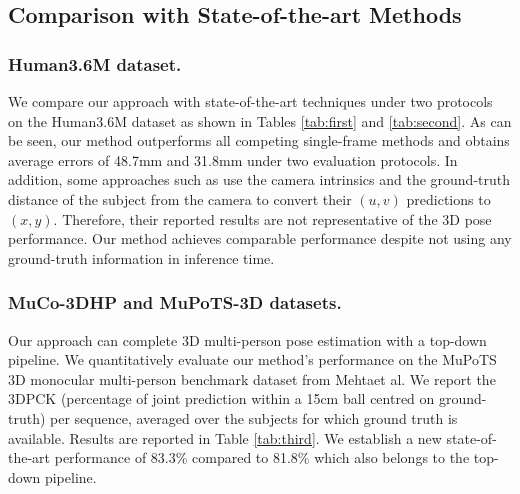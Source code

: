\documentclass[letterpaper]{article} \usepackage{aaai21}  \usepackage{times}  \usepackage{helvet} \usepackage{courier}  \usepackage[hyphens]{url}  \usepackage{graphicx} \urlstyle{rm} \def\UrlFont{\rm}  \usepackage{natbib}  \usepackage{caption} \frenchspacing  \setlength{\pdfpagewidth}{8.5in}  \setlength{\pdfpageheight}{11in}
\begin{document}
\subsection{Comparison with State-of-the-art Methods}

\subsubsection{Human3.6M dataset.}
We compare our approach with state-of-the-art techniques under two protocols on the Human3.6M dataset \cite{ionescu2013human3} as shown in Tables \ref{tab:first} and \ref{tab:second}. As can be seen, our method outperforms all competing single-frame methods and obtains average errors of 48.7mm and 31.8mm under two evaluation protocols. In addition, some approaches such as \cite{sun2018integral,zhou2019hemlets} use the camera intrinsics and the ground-truth distance of the subject from the camera to convert their $(u,v)$ predictions to $(x,y)$. Therefore, their reported results are not representative of the 3D pose performance. Our method achieves comparable performance despite not using any ground-truth information in inference time.


\begin{table}[ht]
  \centering
  \small{
  }\caption{Comparison of our approach on the MuPoTS-3D benchmark dataset. The metric used is 3D percentage of correct keypoints (3DPCK), so higher is better.}
  \label{tab:third}\end{table}

\subsubsection{MuCo-3DHP and MuPoTS-3D datasets.} Our approach can complete 3D multi-person pose estimation with a top-down pipeline. We quantitatively evaluate our method’s performance on the MuPoTS 3D monocular multi-person benchmark dataset from Mehtaet al. We report the 3DPCK (percentage of joint prediction within a 15cm ball centred on ground-truth) per sequence, averaged over the subjects for which ground truth is available. Results are reported in Table \ref{tab:third}. We establish a new state-of-the-art performance of 83.3\% compared to 81.8\% which also belongs to the top-down pipeline. 
\end{document}
